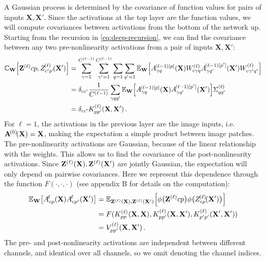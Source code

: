 \documentclass{article}
\theoremstyle{definition}
\newcommand{\vX}{\mathbf{X}}
\newcommand{\vW}{\mathbf{W}}
\begin{document}
A Gaussian process is determined by the covariance of function values for pairs of inputs $\vX,\vX'$. Since the activations at the top layer are the function values, we will compute covariances between activations from the bottom of the network up.
Starting from the recursion in \cref{eq:deep-recursion}, we can find the covariance between any two pre-nonlinearity activations from a pair of inputs $\vX,\vX'$:
\begin{align}
    \mathbb{C}_{\vW}\left[\layerAs{\ell}{cp}, \layerAsd{\ell}{c'p'} \right] &= \sum_{\gamma=1}^{\layerC{\ell-1}} \sum_{\gamma'=1}^{\layerC{\ell-1}} \sum_{q=1}^{}\sum_{q'=1}^{} \Exp{\vW}{\layerNLAs{(\ell-1)[p]}{\gamma q}\layerWs{\ell}_{c\gamma q} \layerNLAsd{(\ell-1)[p']}{\gamma q'}\layerWs{\ell}_{c\gamma' q'}} \nonumber \\
    &= \delta_{cc'} \frac{1}{\layerC{\ell-1}} \sum_{\gamma qq'} \Exp{\vW}{\layerNLAs{(\ell-1)[p]}{\gamma q} \layerNLAsd{(\ell-1)[p']}{\gamma q'}} \priorWcovs{\ell}_{qq'} \nonumber \\
    &= \delta_{cc'} K^{(\ell)}_{pp'}(\vX, \vX') \label{eq:kernel-recursion} \,.
\end{align}
For $\ell=1$, the activations in the previous layer are the image inputs, i.e.~$\layerNLA{(0)}{} = \vX$, making the expectation a simple product between image patches. The pre-nonlinearity activations are Gaussian, because of the linear relationship with the weights. This allows us to find the covariance of the post-nonlinearity activations. Since $\layerA{\ell}{},\layerAd{\ell}{}$ are jointly Gaussian, the expectation will only depend on pairwise covariances. Here we represent this dependence through the function $F(\cdot, \cdot, \cdot)$ (see appendix B for details on the computation):
\begin{align}
    \Exp{\vW}{\layerNLAs{\ell}{cp}\layerNLAsd{\ell}{cp'}} &= \Exp{ \layerA{\ell}{}, \layerAd{\ell}{} }{\phi\big(\layerAs{\ell}{cp}\big) \phi\big(\layerAsd{\ell}{cp}\big)} \label{eq:post-nonlin} \nonumber \\
    &= F(K^{(\ell)}_{pp}(\vX, \vX), K^{(\ell)}_{pp'}(\vX, \vX'), K^{(\ell)}_{p'p'}(\vX', \vX'))\nonumber\\
    &= V_{pp'}^{(\ell)}(\vX, \vX')\,.
\end{align}
The pre- and post-nonlinearity activations are independent between different channels, and identical over all channels, so we omit denoting the channel indices.
\end{document}
